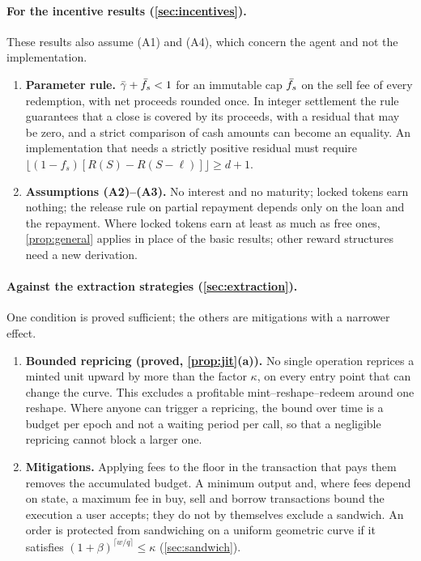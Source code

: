 \paragraph{For the incentive results (\cref{sec:incentives}).} These results also assume (A1) and (A4), which concern the agent and not the implementation.
\begin{enumerate}[label=C\arabic*.,leftmargin=2.4em,resume]
\item \textbf{Parameter rule.} $\bar\gamma+\bar f_s<1$ for an immutable cap $\bar f_s$ on the sell fee of every redemption, with net proceeds rounded once. In integer settlement the rule guarantees that a close is covered by its proceeds, with a residual that may be zero, and a strict comparison of cash amounts can become an equality. An implementation that needs a strictly positive residual must require $\lfloor(1-f_s)[R(S)-R(S-\ell)]\rfloor\ge d+1$.
\item \textbf{Assumptions (A2)--(A3).} No interest and no maturity; locked tokens earn nothing; the release rule on partial repayment depends only on the loan and the repayment. Where locked tokens earn at least as much as free ones, \cref{prop:general} applies in place of the basic results; other reward structures need a new derivation.
\end{enumerate}

\paragraph{Against the extraction strategies (\cref{sec:extraction}).} One condition is proved sufficient; the others are mitigations with a narrower effect.
\begin{enumerate}[label=C\arabic*.,leftmargin=2.4em,resume]
\item \textbf{Bounded repricing (proved, \cref{prop:jit}(a)).} No single operation reprices a minted unit upward by more than the factor $\kappa$, on every entry point that can change the curve. This excludes a profitable mint--reshape--redeem around one reshape. Where anyone can trigger a repricing, the bound over time is a budget per epoch and not a waiting period per call, so that a negligible repricing cannot block a larger one.
\item \textbf{Mitigations.} Applying fees to the floor in the transaction that pays them removes the accumulated budget. A minimum output and, where fees depend on state, a maximum fee in buy, sell and borrow transactions bound the execution a user accepts; they do not by themselves exclude a sandwich. An order is protected from sandwiching on a uniform geometric curve if it satisfies $(1+\beta)^{\lceil w/q\rceil}\le\kappa$ (\cref{sec:sandwich}).
\end{enumerate}

